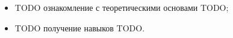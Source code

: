 
\begin{itemize}

	\item TODO ознакомление с теоретическими основами TODO;
	\item TODO получение навыков TODO.

\end{itemize}


